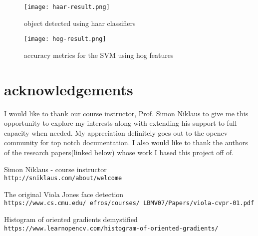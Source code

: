 \documentclass[%
 aip,
 jmp,%
 amsmath,amssymb,
 reprint,%
]{revtex4-1}
\begin{document}
\begin{figure}[h]
\texttt{[image: haar-result.png]}
\caption{object detected using haar classifiers}
\label{fig:haar-result}
\end{figure}

\begin{figure}[h]
\texttt{[image: hog-result.png]}
\caption{accuracy metrics for the SVM using hog features}
\label{fig:hog-result}
\end{figure}
\FloatBarrier

\section{acknowledgements}
I would like to thank our course instructor, Prof. Simon Niklaus to give me this opportunity to explore my interests along with extending his support to full capacity when needed. My appreciation definitely goes out to the opencv community for top notch documentation. I also would like to thank the authors of the research papers(linked below) whose work I based this project off of. 

\begin{thebibliography}{9}
Simon Niklaus - course instructor 
\\\texttt{http://sniklaus.com/about/welcome} 
 
The original Viola Jones face detection 
\\\texttt{https://www.cs.cmu.edu/~efros/courses/
LBMV07/Papers/viola-cvpr-01.pdf} 

 
Histogram of oriented gradients demystified
\\\texttt{https://www.learnopencv.com/histogram-of-oriented-gradients/}
\end{thebibliography}
\end{document}
